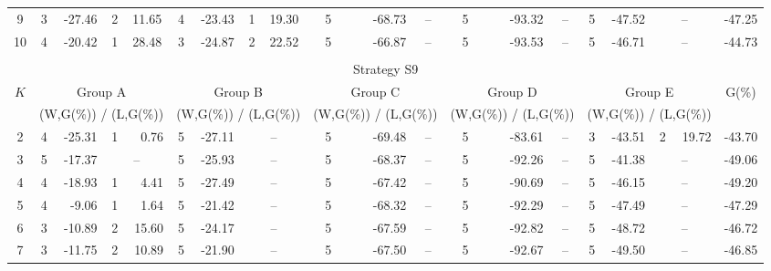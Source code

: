 \documentclass[11pt]{article}
\begin{document}
\begin{table}[!ht]
\begin{center}
{\begin{tabular}{|c|rrrr|rrrr|rrrr|rrrr|rrrr|r|}
9 & 3 & -27.46 & 2 & \multicolumn{1}{c|}{11.65} & 4 & -23.43 & 1 & \multicolumn{1}{c|}{19.30} & 5 & -68.73 & \multicolumn{2}{c|}{--} & 5 & -93.32 & \multicolumn{2}{c|}{--} & 5 & -47.52 & \multicolumn{2}{c|}{--} & -47.25 \\
10 & 4 & -20.42 & 1 & \multicolumn{1}{c|}{28.48} & 3 & -24.87 & 2 & \multicolumn{1}{c|}{22.52} & 5 & -66.87 & \multicolumn{2}{c|}{--} & 5 & -93.53 & \multicolumn{2}{c|}{--} & 5 & -46.71 & \multicolumn{2}{c|}{--} & -44.73  \\
\hline
\multicolumn{22}{c}{}\\
\hline
\multicolumn{22}{|c|}{Strategy S9}\\
\hline
\multicolumn{1}{|c|}{\multirow{2}{*}{$K$}} &
\multicolumn{4}{|c}{Group A} & 
\multicolumn{4}{|c}{Group B} & 
\multicolumn{4}{|c}{Group C} & 
\multicolumn{4}{|c}{Group D} & 
\multicolumn{4}{|c}{Group E} & 
\multicolumn{1}{|c|}{\multirow{2}{*}{G(\%)}}\\
\cline{2-21}
& \multicolumn{4}{|c}{(W,G(\%)) / (L,G(\%))} 
& \multicolumn{4}{|c}{(W,G(\%)) / (L,G(\%))} 
& \multicolumn{4}{|c}{(W,G(\%)) / (L,G(\%))} 
& \multicolumn{4}{|c}{(W,G(\%)) / (L,G(\%))} 
& \multicolumn{4}{|c}{(W,G(\%)) / (L,G(\%))} 
& \multicolumn{1}{|c|}{}\\
\hline
\hline
2 & 4 & -25.31 & 1 & 0.76 & 5 & -27.11 & \multicolumn{2}{c|}{--} & 5 & -69.48 & \multicolumn{2}{c|}{--} & 5 & -83.61 & \multicolumn{2}{c|}{--} & 3 & -43.51 & 2 & 19.72 & {-43.70} \\
3 & 5 & -17.37 & \multicolumn{2}{c|}{--} & 5 & -25.93 & \multicolumn{2}{c|}{--} & 5 & -68.37 & \multicolumn{2}{c|}{--} & 5 & -92.26 & \multicolumn{2}{c|}{--} & 5 & -41.38 & \multicolumn{2}{c|}{--} & {-49.06} \\
4 & 4 & -18.93 & 1 & {4.41} & 5 & -27.49 & \multicolumn{2}{c|}{--} & 5 & -67.42 & \multicolumn{2}{c|}{--} & 5 & -90.69 & \multicolumn{2}{c|}{--} & 5 & -46.15 & \multicolumn{2}{c|}{--} & {-49.20} \\
5 & 4 & -9.06 & 1 & {1.64} & 5 & -21.42 & \multicolumn{2}{c|}{--} & 5 & -68.32 & \multicolumn{2}{c|}{--} & 5 & -92.29 & \multicolumn{2}{c|}{--} & 5 & -47.49 & \multicolumn{2}{c|}{--} & {-47.29} \\
6 & 3 & -10.89 & 2 & {15.60} & 5 & -24.17 & \multicolumn{2}{c|}{--} & 5 & -67.59 & \multicolumn{2}{c|}{--} & 5 & -92.82 & \multicolumn{2}{c|}{--} & 5 & -48.72 & \multicolumn{2}{c|}{--} & {-46.72} \\
7 & 3 & -11.75 & 2 & {10.89} & 5 & -21.90 & \multicolumn{2}{c|}{--} & 5 & -67.50 & \multicolumn{2}{c|}{--} & 5 & -92.67 & \multicolumn{2}{c|}{--} & 5 & -49.50 & \multicolumn{2}{c|}{--} & {-46.85} \\

\end{tabular}}
\end{center}
\end{table}
\end{document}
